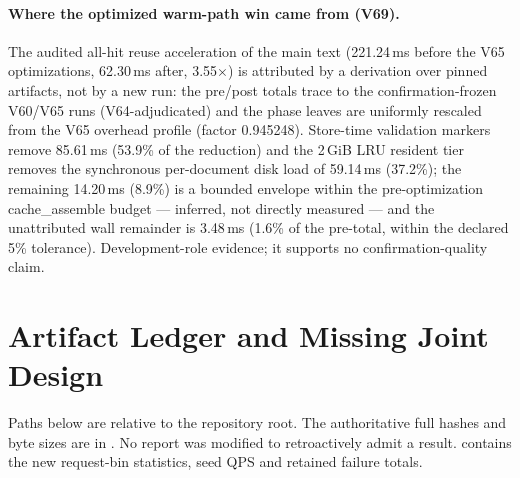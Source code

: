 \paragraph{Where the optimized warm-path win came from (V69).}
The audited all-hit reuse acceleration of the main text (221.24\,ms before the
V65 optimizations, 62.30\,ms after, 3.55$\times$) is attributed by a
derivation over pinned artifacts, not by a new run: the pre/post totals trace
to the confirmation-frozen V60/V65 runs (V64-adjudicated) and the phase leaves
are uniformly rescaled from the V65 overhead profile (factor 0.945248).
Store-time validation markers remove 85.61\,ms (53.9\% of the reduction) and
the 2\,GiB LRU resident tier removes the synchronous per-document disk load of
59.14\,ms (37.2\%); the remaining 14.20\,ms (8.9\%) is a bounded envelope
within the pre-optimization cache\_assemble budget --- inferred, not directly
measured --- and the unattributed wall remainder is 3.48\,ms (1.6\% of the
pre-total, within the declared 5\% tolerance). Development-role evidence; it
supports no confirmation-quality claim.

\begin{table}[H]
\centering\small
\caption{Attribution of the 221.2\,ms $\to$ 62.3\,ms all-hit reuse reduction
(V69 derivation over pinned V60/V65 artifacts). OPT-1 and OPT-2 are measured
pre-optimization phases removed by the V65 changes; OPT-3 is a bounded
envelope, not a direct measurement. Development-role evidence; no
confirmation-quality claim.}
\label{tab:v69attribution}
\end{table}

\newpage
\section{Artifact Ledger and Missing Joint Design}
\label{app:ledger}

Paths below are relative to the repository root. The authoritative full hashes
and byte sizes are in . No report was modified to
retroactively admit a result.  contains the
new request-bin statistics, seed QPS and retained failure totals.

